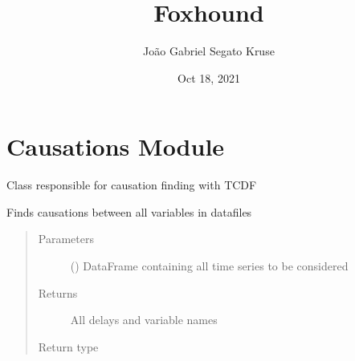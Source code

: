 \documentclass[letterpaper,10pt,english]{sphinxmanual}
\title{Foxhound}
\date{Oct 18, 2021}
\author{João Gabriel Segato Kruse}
\begin{document}
\pagestyle{empty}
\sphinxmaketitle
\pagestyle{plain}
\sphinxtableofcontents
\pagestyle{normal}
\label{\detokenize{index::doc}}



\chapter{Causations  Module}
\label{\detokenize{causations:module-causations}}\label{\detokenize{causations:causations-module}}\label{\detokenize{causations::doc}}

\begin{fulllineitems}
\label{\detokenize{causations:causations.Causations}}
\sphinxAtStartPar
Class responsible for causation finding with TCDF

\begin{fulllineitems}
\label{\detokenize{causations:causations.Causations.get_causation}}
\sphinxAtStartPar
Finds causations between all variables in datafiles
\begin{quote}\begin{description}
\item[{Parameters}] \leavevmode
\sphinxAtStartPar
{} () \textendash{} DataFrame containing all time series to be considered

\item[{Returns}] \leavevmode
\sphinxAtStartPar
All delays and variable names

\item[{Return type}] \leavevmode
\sphinxAtStartPar
{}

\end{description}\end{quote}


\end{fulllineitems}
\end{fulllineitems}
\end{document}
